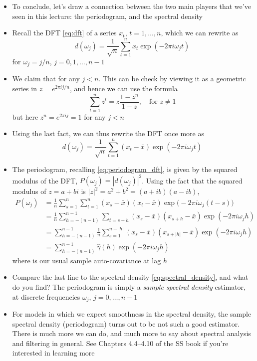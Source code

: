 \documentclass{article}
\begin{document}
\begin{itemize}
\item To conclude, let's draw a connection between the two main players that
  we've seen in this lecture: the periodogram, and the spectral density 

\item Recall the DFT \eqref{eq:dft} of a series $x_t$, $t = 1,\dots,n$, which we
  can rewrite as
  \[
  d(\omega_j) = \frac{1}{\sqrt{n}} \sum_{t=1}^n x_t \exp(-2\pi i \omega_j t) 
  \]
  for $\omega_j = j/n$, $j = 0,1,\dots,n-1$

\item We claim that 
  for any $j < n$. This can be check by viewing it as a geometric series
   in $z = e^{2\pi i j / n}$, and hence we can use the
  formula  
  \[
  \sum_{t=1}^n z^t = z \frac{1-z^n}{1-z}, \quad \text{for $z \not= 1$}
  \] 
  but here $z^n = e^{2\pi i j} = 1$ for any $j < n$

\item Using the last fact, we can thus rewrite the DFT once more as  
  \[
  d(\omega_j) = \frac{1}{\sqrt{n}} \sum_{t=1}^n (x_t - \bar{x}) \exp(-2\pi i
  \omega_j t)
  \]

\item The periodogram, recalling \eqref{eq:periodogram_dft}, is given by the 
  squared modulus of the DFT, $P(\omega_j) = |d(\omega_j)|^2$. Using the fact
  that the squared modulus of $z = a+bi$ is $|z|^2 = a^2 + b^2 = (a+ib)(a-ib)$,  
  \begin{align*}
  P(\omega_j) &= \frac{1}{n} \sum_{s=1}^n \sum_{t=1}^n (x_s - \bar{x}) (x_t -
    \bar{x}) \exp\big( -2\pi i \omega_j (t-s) \big) \\
  &= \frac{1}{n} \sum_{h=-(n-1)}^{n-1} \sum_{t = s+h} (x_s - \bar{x}) (x_{s+h} -
    \bar{x}) \exp(-2\pi i \omega_j h) \\
  &= \sum_{h=-(n-1)}^{n-1} \frac{1}{n} \sum_{s=1}^{n-|h|} (x_s - \bar{x})
    (x_{s+|h|} - \bar{x}) \exp(-2\pi i \omega_j h) \\
  &= \sum_{h=-(n-1)}^{n-1} \hat\gamma(h) \exp(-2\pi i \omega_j h)
  \end{align*}
  where  is our usual sample auto-covariance at lag $h$ 

\item Compare the last line to the spectral density \eqref{eq:spectral_density},
  and what do you find? The periodogram is simply a \emph{sample spectral
    density} estimator, at discrete frequencies $\omega_j$, $j = 0,\dots,n-1$ 

\item For models in which we expect smoothness in the spectral density, the
  sample spectral density (periodogram) turns out to be not such a good
  estimator. There is much more we can do, and much more to say about spectral
  analysis and filtering in general. See Chapters 4.4--4.10 of the SS book if
  you're interested in learning more
\end{itemize}
\end{document}
